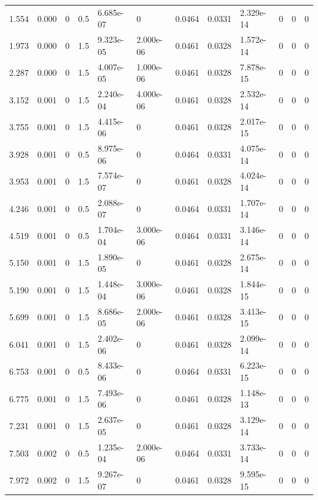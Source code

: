 \documentclass[preview]{standalone}
\begin{document}
{{\begin{tabular}{L{1.2cm}C{1.2cm} C{0.3cm}C{0.5cm} C{1.4cm}C{1.4cm} C{1.4cm}C{1.4cm} C{1.6cm}C{1.6cm} C{1.6cm}C{1.6cm}}
  1.554  &  0.000  & 0     & 0.5 &  6.685e-07  & 0  &  0.0464&   0.0331& 2.329e-14 & 0   &  0 & 0  \\ 
  1.973  &  0.000  & 0     & 1.5 &  9.323e-05  & 2.000e-06  &  0.0461&   0.0328& 1.572e-14 & 0   &  0 & 0  \\ 
  2.287  &  0.000  & 0     & 1.5 &  4.007e-05  & 1.000e-06  &  0.0461&   0.0328& 7.878e-15 & 0   &  0 & 0  \\ 
  3.152  &  0.001  & 0     & 1.5 &  2.240e-04  & 4.000e-06  &  0.0461&   0.0328& 2.532e-14 & 0   &  0 & 0  \\ 
  3.755  &  0.001  & 0     & 1.5 &  4.415e-06  & 0  &  0.0461&   0.0328& 2.017e-15 & 0   &  0 & 0  \\ 
  3.928  &  0.001  & 0     & 0.5 &  8.975e-06  & 0  &  0.0464&   0.0331& 4.075e-14 & 0   &  0 & 0  \\ 
  3.953  &  0.001  & 0     & 1.5 &  7.574e-07  & 0  &  0.0461&   0.0328& 4.024e-14 & 0   &  0 & 0  \\ 
  4.246  &  0.001  & 0     & 0.5 &  2.088e-07  & 0  &  0.0464&   0.0331& 1.707e-14 & 0   &  0 & 0  \\ 
  4.519  &  0.001  & 0     & 0.5 &  1.704e-04  & 3.000e-06  &  0.0464&   0.0331& 3.146e-14 & 0   &  0 & 0  \\ 
  5.150  &  0.001  & 0     & 1.5 &  1.890e-05  & 0  &  0.0461&   0.0328& 2.675e-14 & 0   &  0 & 0  \\ 
  5.190  &  0.001  & 0     & 1.5 &  1.448e-04  & 3.000e-06  &  0.0461&   0.0328& 1.844e-15 & 0   &  0 & 0  \\ 
  5.699  &  0.001  & 0     & 1.5 &  8.686e-05  & 2.000e-06  &  0.0461&   0.0328& 3.413e-15 & 0   &  0 & 0  \\ 
  6.041  &  0.001  & 0     & 1.5 &  2.402e-06  & 0  &  0.0461&   0.0328& 2.099e-14 & 0   &  0 & 0  \\ 
  6.753  &  0.001  & 0     & 0.5 &  8.433e-06  & 0  &  0.0464&   0.0331& 6.223e-15 & 0   &  0 & 0  \\ 
  6.775  &  0.001  & 0     & 1.5 &  7.493e-06  & 0  &  0.0461&   0.0328& 1.148e-13 & 0   &  0 & 0  \\ 
  7.231  &  0.001  & 0     & 1.5 &  2.637e-05  & 0  &  0.0461&   0.0328& 3.129e-14 & 0   &  0 & 0  \\ 
  7.503  &  0.002  & 0     & 0.5 &  1.235e-04  & 2.000e-06  &  0.0464&   0.0331& 3.733e-14 & 0   &  0 & 0  \\ 
  7.972  &  0.002  & 0     & 1.5 &  9.267e-07  & 0  &  0.0461&   0.0328& 9.595e-15 & 0   &  0 & 0  \\ 

\end{tabular}}}
\end{document}
